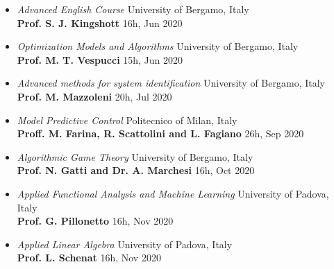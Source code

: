 \documentclass[10pt]{article}
\begin{document}
\begin{itemize}
	\item \textit{Advanced English Course} \hfill University of Bergamo, Italy\\
	\textbf{Prof. S. J. Kingshott} \hfill 16h, Jun 2020\\
	
	\item \textit{Optimization Models and Algorithms} \hfill University of Bergamo, Italy\\
	\textbf{Prof. M. T. Vespucci} \hfill 15h, Jun 2020\\
	
	\item \textit{Advanced methods for system identification} \hfill University of Bergamo, Italy\\
	\textbf{Prof. M. Mazzoleni} \hfill 20h, Jul 2020\\
	
	\item \textit{Model Predictive Control} \hfill Politecnico of Milan, Italy\\
	\textbf{Proff. M. Farina, R. Scattolini and L. Fagiano} \hfill 26h, Sep 2020\\

	\item \textit{Algorithmic Game Theory} \hfill University of Bergamo, Italy\\
	\textbf{Prof. N. Gatti and Dr. A. Marchesi} \hfill 16h, Oct 2020\\

	\item \textit{Applied Functional Analysis and Machine Learning} \hfill University of Padova, Italy\\
	\textbf{Prof. G. Pillonetto} \hfill 16h, Nov 2020\\

	\item \textit{Applied Linear Algebra} \hfill University of Padova, Italy\\
	\textbf{Prof. L. Schenat} \hfill 16h, Nov 2020\\
\end{itemize}

\clearpage

\vspace{6pt} %
\end{document}
